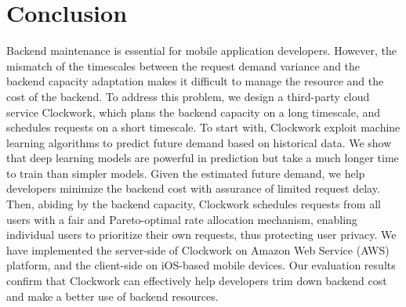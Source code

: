 \section{Conclusion}\label{sec:conclusion}

Backend maintenance is essential for mobile application developers. However, the mismatch of the timescales between the request demand variance and the backend capacity adaptation makes it difficult to manage the resource and the cost of the backend. To address this problem, we design a third-party cloud service Clockwork, which plans the backend capacity on a long timescale, and schedules requests on a short timescale. To start with, Clockwork exploit machine learning algorithms to predict future demand based on historical data. We show that deep learning models are powerful in prediction but take a much longer time to train than simpler models. Given the estimated future demand, we help developers minimize the backend cost with assurance of limited request delay. Then, abiding by the backend capacity, Clockwork schedules requests from all users with a fair and Pareto-optimal rate allocation mechanism, enabling individual users to prioritize their own requests, thus protecting user privacy. We have implemented the server-side of Clockwork on Amazon Web Service (AWS) platform, and the client-side on iOS-based mobile devices. Our evaluation results confirm that Clockwork can effectively help developers trim down backend cost and make a better use of backend resources. 